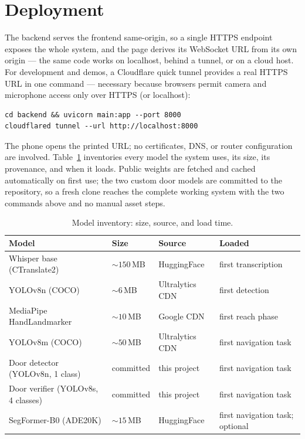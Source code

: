 \section{Deployment}
\label{sec:deployment}

The backend serves the frontend same-origin, so a single HTTPS endpoint exposes
the whole system, and the page derives its WebSocket URL from its own origin ---
the same code works on localhost, behind a tunnel, or on a cloud host. For
development and demos, a Cloudflare quick tunnel provides a real HTTPS URL in one
command --- necessary because browsers permit camera and microphone access only
over HTTPS (or localhost):

\begin{lstlisting}
cd backend && uvicorn main:app --port 8000
cloudflared tunnel --url http://localhost:8000
\end{lstlisting}

The phone opens the printed URL; no certificates, DNS, or router configuration
are involved. Table~\ref{tab:models} inventories every model the system uses,
its size, its provenance, and when it loads. Public weights are fetched and
cached automatically on first use; the two custom door models are committed to
the repository, so a fresh clone reaches the complete working system with the
two commands above and no manual asset steps.

\begin{table}[!htbp]
\centering
\caption[Model inventory]{Model inventory: size, source, and load time.}
\label{tab:models}
\small
\begin{tabular}{p{4.1cm} l p{2.6cm} p{4.3cm}}
\toprule
\textbf{Model} & \textbf{Size} & \textbf{Source} & \textbf{Loaded} \\
\midrule
Whisper base (CTranslate2) & ${\sim}150$\,MB & HuggingFace & first transcription \\
YOLOv8n (COCO) & ${\sim}6$\,MB & Ultralytics CDN & first detection \\
MediaPipe HandLandmarker & ${\sim}10$\,MB & Google CDN & first reach phase \\
YOLOv8m (COCO) & ${\sim}50$\,MB & Ultralytics CDN & first navigation task \\
Door detector (YOLOv8n, 1 class) & committed & this project & first navigation task \\
Door verifier (YOLOv8s, 4 classes) & committed & this project & first navigation task \\
SegFormer-B0 (ADE20K) & ${\sim}15$\,MB & HuggingFace & first navigation task; optional \\
\bottomrule
\end{tabular}
\end{table}

